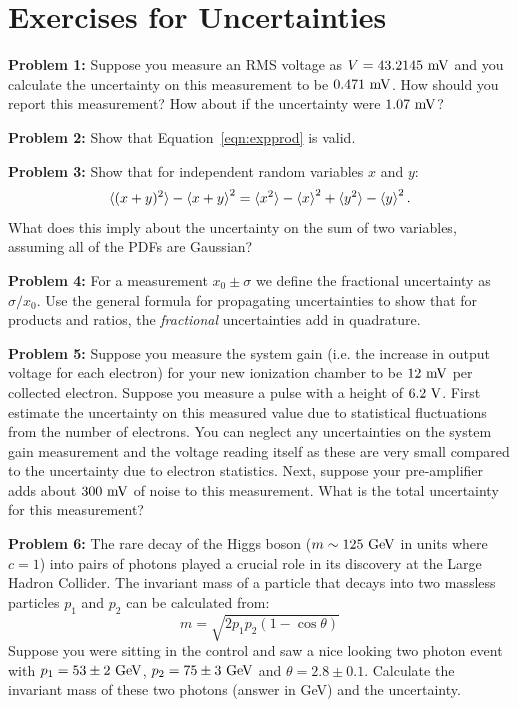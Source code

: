 \documentclass[12pt,oneside]{book}
\begin{document}
\section{Exercises for Uncertainties}

\noindent
{\bf Problem 1:}  Suppose you measure an RMS voltage as $V = 43.2145~\rm mV$ and you calculate the uncertainty on this measurement to be $0.471~\rm mV$.  How should you report this measurement?  How about if the uncertainty were $1.07~\rm mV$? \\ \vskip 0.25cm

\noindent
{\bf Problem 2:}  Show that Equation~\ref{eqn:expprod} is valid. \\ \vskip 0.25cm

\noindent
{\bf Problem 3:}  Show that for independent random variables $x$ and $y$:
\begin{displaymath}
\braket{(x+y)^2} - \braket{x+y}^2 = \braket{x^2} - \braket{x}^2 + \braket{y^2} - \braket{y}^2.
\end{displaymath}
What does this imply about the uncertainty on the sum of two variables, assuming all of the PDFs are Gaussian? \\ \vskip 0.25cm

\noindent
{\bf Problem 4:}  For a measurement $x_0 \pm \sigma$ we define the fractional uncertainty as $\sigma/x_0$.  Use the general formula for propagating uncertainties to show that for products and ratios, the {\em fractional} uncertainties add in quadrature.  \\ \vskip 0.25cm

\noindent
{\bf Problem 5:}  Suppose you measure the system gain (i.e. the increase in output voltage for each electron) for your new ionization chamber to be $12~\rm mV$ per collected electron.  Suppose you measure a pulse with a height of $6.2~\rm V$.  First estimate the uncertainty on this measured value due to statistical fluctuations from the number of electrons.   You can neglect any uncertainties on the system gain measurement and the voltage reading itself as these are very small compared to the uncertainty due to electron statistics.  Next, suppose your pre-amplifier adds about $300~\rm mV$ of noise to this measurement.  What is the total uncertainty for this measurement? \\ \vskip 0.25cm

\noindent
{\bf Problem 6:}  The rare decay of the Higgs boson ($m \sim125~\rm GeV$ in units where $c=1$) into pairs of photons played a crucial role in its discovery at the Large Hadron Collider.  The invariant mass of a particle that decays into two massless particles $p_1$ and $p_2$ can be calculated from:
\begin{displaymath}
m = \sqrt{2  p_1 p_2 (1 - \cos\theta)}
\end{displaymath}
Suppose you were sitting in the control and saw a nice looking two photon event with 
$p_1=53 \pm 2~\rm GeV$, $p_2=75 \pm 3~\rm GeV$ and $\theta = 2.8 \pm 0.1$.   Calculate the invariant mass of these two photons (answer in GeV) and the uncertainty. \\ \vskip 0.25cm
\end{document}
